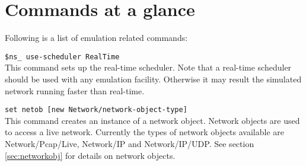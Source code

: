 \section{Commands at a glance}
\label{sec:emulationcommand}

Following is a list of emulation related commands:
\begin{flushleft}
{\tt \$ns\_ use-scheduler RealTime}\\
This command sets up the real-time scheduler. Note that a real-time scheduler
should be used with any emulation facility. Otherwise it may result the simulated network
running faster than real-time.

{\tt set netob [new Network/\<network-object-type\>]}\\
This command creates an instance of a network object. Network objects are used
to access a live network. Currently the types of network objects  available
are Network/Pcap/Live, Network/IP and Network/IP/UDP. See section
\ref{sec:networkobj} for details on network objects.

\end{flushleft}

\endinput
